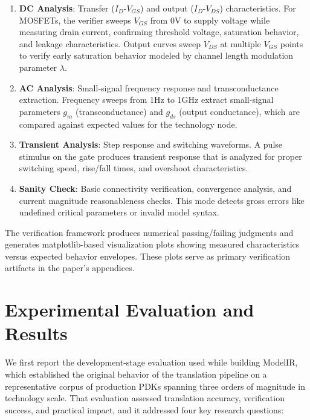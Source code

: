 \documentclass[10pt,twocolumn]{article}
\begin{document}
\begin{enumerate}
\item \textbf{DC Analysis}: Transfer ($I_D$-$V_{GS}$) and output ($I_D$-$V_{DS}$) characteristics. For MOSFETs, the verifier sweeps $V_{GS}$ from 0V to supply voltage while measuring drain current, confirming threshold voltage, saturation behavior, and leakage characteristics. Output curves sweep $V_{DS}$ at multiple $V_{GS}$ points to verify early saturation behavior modeled by channel length modulation parameter $\lambda$.

\item \textbf{AC Analysis}: Small-signal frequency response and transconductance extraction. Frequency sweeps from 1Hz to 1GHz extract small-signal parameters $g_m$ (transconductance) and $g_{ds}$ (output conductance), which are compared against expected values for the technology node.

\item \textbf{Transient Analysis}: Step response and switching waveforms. A pulse stimulus on the gate produces transient response that is analyzed for proper switching speed, rise/fall times, and overshoot characteristics.

\item \textbf{Sanity Check}: Basic connectivity verification, convergence analysis, and current magnitude reasonableness checks. This mode detects gross errors like undefined critical parameters or invalid model syntax.
\end{enumerate}

The verification framework produces numerical passing/failing judgments and generates matplotlib-based visualization plots showing measured characteristics versus expected behavior envelopes. These plots serve as primary verification artifacts in the paper's appendices.

\section{Experimental Evaluation and Results}
\label{sec:evaluation}

We first report the development-stage evaluation used while building ModelIR, which established the original behavior of the translation pipeline on a representative corpus of production PDKs spanning three orders of magnitude in technology scale. That evaluation assessed translation accuracy, verification success, and practical impact, and it addressed four key research questions:
\end{document}

